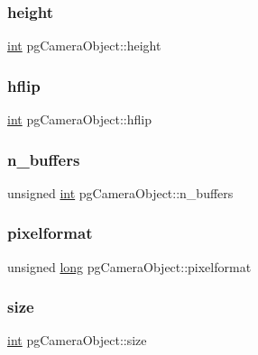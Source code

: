 \subsubsection{\texorpdfstring{height}{height}}
{\footnotesize\ttfamily \mbox{\hyperlink{warnings_8h_a74f207b5aa4ba51c3a2ad59b219a423b}{int}} pg\+Camera\+Object\+::height}

\mbox{\label{structpg_camera_object_ada4373b31446c2a8c32f7dff337e4ecb}} 
\subsubsection{\texorpdfstring{hflip}{hflip}}
{\footnotesize\ttfamily \mbox{\hyperlink{warnings_8h_a74f207b5aa4ba51c3a2ad59b219a423b}{int}} pg\+Camera\+Object\+::hflip}

\mbox{\label{structpg_camera_object_a36c2aa8e4eab51a8d5c4fb7637fcb529}} 
\subsubsection{\texorpdfstring{n\_buffers}{n\_buffers}}
{\footnotesize\ttfamily unsigned \mbox{\hyperlink{warnings_8h_a74f207b5aa4ba51c3a2ad59b219a423b}{int}} pg\+Camera\+Object\+::n\+\_\+buffers}

\mbox{\label{structpg_camera_object_aadebf2a23776c2df3c8031eed99fcfe4}} 
\subsubsection{\texorpdfstring{pixelformat}{pixelformat}}
{\footnotesize\ttfamily unsigned \mbox{\hyperlink{modsupport_8h_a0cb68e00fb9fb1260ee2daadd9fe6611}{long}} pg\+Camera\+Object\+::pixelformat}

\mbox{\label{structpg_camera_object_ad5646e2f4c997c12a44a52ad59c2c608}} 
\subsubsection{\texorpdfstring{size}{size}}
{\footnotesize\ttfamily \mbox{\hyperlink{warnings_8h_a74f207b5aa4ba51c3a2ad59b219a423b}{int}} pg\+Camera\+Object\+::size}

